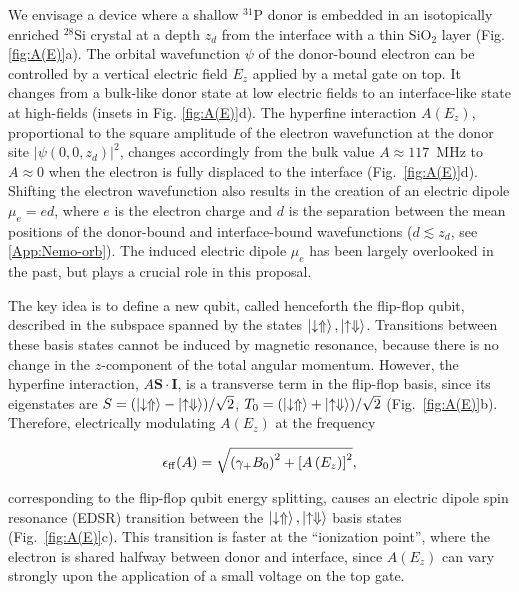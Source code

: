 \documentclass[aps,prb,superscriptaddress,nobibnotes,twocolumn]{revtex4-1}
\begin{document}
We envisage a device where a shallow $^{31}$P donor is embedded in an isotopically enriched $^{28}$Si crystal at a depth $z_d$ from the interface with a thin SiO$_2$ layer (Fig. \ref{fig:A(E)}a). The orbital wavefunction $\psi$ of the donor-bound electron can be controlled by a vertical electric field $E_z$ applied by a metal gate on top. It changes from a bulk-like donor state at low electric fields to an interface-like state at high-fields \cite{Calderon2006,Lansbergen2008} (insets in Fig. \ref{fig:A(E)}d). The hyperfine interaction $A(E_z)$, proportional to the square amplitude of the electron wavefunction at the donor site $|\psi(0,0,z_d)|^2$, changes accordingly from the bulk value $A \approx 117$~MHz to $A \approx 0$ when the electron is fully displaced to the interface (Fig.~\ref{fig:A(E)}d). Shifting the electron wavefunction also results in the creation of an electric dipole $\mu_e = ed$, where $e$ is the electron charge and $d$ is the separation between the mean positions of the donor-bound and interface-bound wavefunctions ($d \lesssim z_d$, see \ref{App:Nemo-orb}). The induced electric dipole $\mu_e$ has been largely overlooked in the past, but plays a crucial role in this proposal.

The key idea is to define a new qubit, called henceforth the flip-flop qubit, described in the subspace spanned by the states $\ket{\downarrow \Uparrow}, \ket{\uparrow \Downarrow}$. Transitions between these basis states cannot be induced by magnetic resonance, because there is no change in the $z$-component of the total angular momentum. However, the hyperfine interaction, $A\mathbf{S\cdot I}$,  is a transverse term in the flip-flop basis, since its eigenstates are $S=(\ket{\downarrow \Uparrow} - \ket{\uparrow \Downarrow})/\sqrt{2}$, $T_0=(\ket{\downarrow \Uparrow} + \ket{\uparrow \Downarrow})/\sqrt{2}$ (Fig.~\ref{fig:A(E)}b). Therefore, electrically modulating $A(E_z)$ at the frequency

\begin{equation} \label{eq:e_ff}
\epsilon_{\rm ff}(A)=\sqrt{\left(\gamma_+B_0\right)^2+\left[A\left(E_z\right)\right]^2},
\end{equation}

corresponding to the flip-flop qubit energy splitting, causes an electric dipole spin resonance (EDSR) transition between the $\ket{\downarrow \Uparrow}, \ket{\uparrow \Downarrow}$ basis states \cite{Laird2007,Luo2012} (Fig.~\ref{fig:A(E)}c). This transition is faster at the ``ionization point'', where the electron is shared halfway between donor and interface, since $A(E_z)$ can vary strongly upon the application of a small voltage on the top gate.
\end{document}
